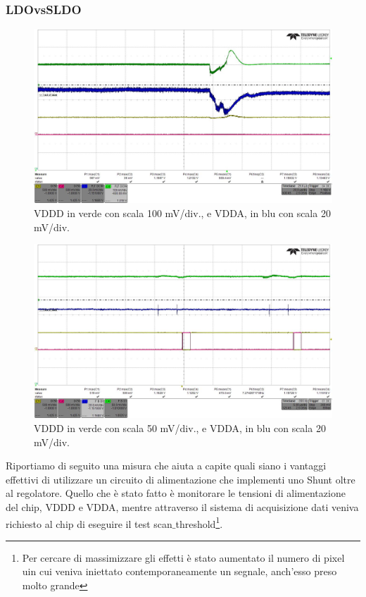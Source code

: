 \subsubsection{LDOvsSLDO}
\begin{figure}
\centering
\includegraphics[scale=.3]{Immagini/alllin1}
\caption{VDDD in verde con scala 100 mV/div., e VDDA, in blu con scala 20 mV/div.}
\label{alllin1}
\end{figure}
\begin{figure}
\centering
\includegraphics[scale=.3]{Immagini/alllin2}
\caption{VDDD in verde con scala 50 mV/div., e VDDA, in blu con scala 20 mV/div.}
\label{alllin2}
\end{figure}
Riportiamo di seguito una misura che aiuta a capite quali siano i vantaggi effettivi di utilizzare un circuito di alimentazione che implementi uno Shunt oltre al regolatore. Quello che è stato fatto è monitorare le tensioni di alimentazione del chip, VDDD e VDDA, mentre attraverso il sistema di acquisizione dati veniva richiesto al chip di eseguire il test scan$\_$threshold\footnote{Per cercare di massimizzare gli effetti è stato aumentato il numero di pixel uin cui veniva iniettato contemporaneamente un segnale, anch'esso preso molto grande}. 
